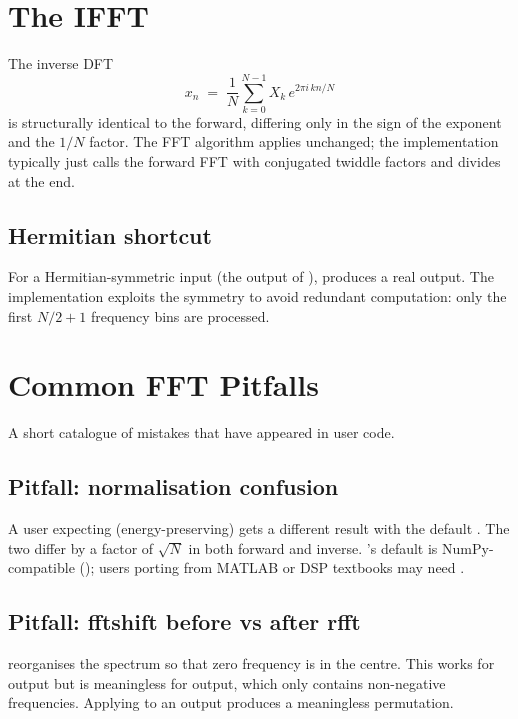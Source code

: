 \section{The IFFT}
\label{sec:fft:ifft}

The inverse DFT
\[
x_n \;=\; \frac{1}{N} \sum_{k=0}^{N-1} X_k \,e^{2\pi i\, kn / N}
\]
is structurally identical to the forward, differing only in the
sign of the exponent and the $1/N$ factor. The FFT algorithm
applies unchanged; the implementation typically just calls the
forward FFT with conjugated twiddle factors and divides at the
end.

\subsection{Hermitian shortcut}
\label{ssec:fft:hermitian_shortcut}

For a Hermitian-symmetric input (the output of ),
 produces a real output. The implementation exploits
the symmetry to avoid redundant computation: only the first
$N/2 + 1$ frequency bins are processed.

\section{Common FFT Pitfalls}
\label{sec:fft:pitfalls}

A short catalogue of mistakes that have appeared in user code.

\subsection{Pitfall: normalisation confusion}
\label{ssec:fft:norm_confusion}

A user expecting  (energy-preserving) gets a
different result with the default . The
two differ by a factor of $\sqrt{N}$ in both forward and inverse.
\Lucid's default is NumPy-compatible (); users
porting from MATLAB or DSP textbooks may need .

\subsection{Pitfall: fftshift before vs after rfft}
\label{ssec:fft:fftshift_after_rfft}

 reorganises the spectrum so that zero frequency
is in the centre. This works for  output but is
meaningless for  output, which only contains
non-negative frequencies. Applying  to an
 output produces a meaningless permutation.

